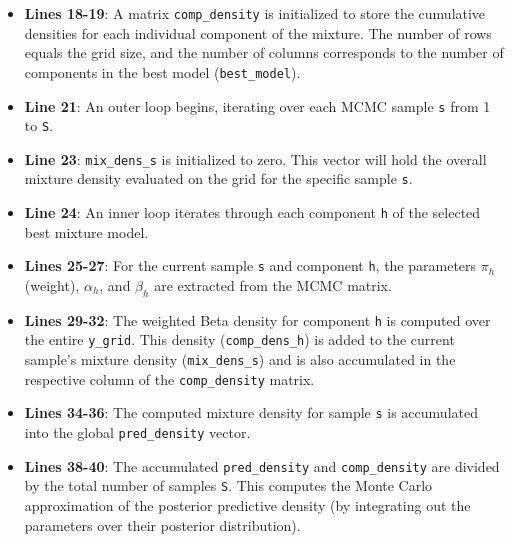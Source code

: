 \documentclass{article}
\begin{document}
\begin{itemize}
  \item \textbf{Lines 18-19}: A matrix \texttt{comp\_density} is initialized to store the cumulative densities for each individual component of the mixture. The number of rows equals the grid size, and the number of columns corresponds to the number of components in the best model (\texttt{best\_model}).
  \item \textbf{Line 21}: An outer loop begins, iterating over each MCMC sample \texttt{s} from 1 to \texttt{S}.
  \item \textbf{Line 23}: \texttt{mix\_dens\_s} is initialized to zero. This vector will hold the overall mixture density evaluated on the grid for the specific sample \texttt{s}.
  \item \textbf{Line 24}: An inner loop iterates through each component \texttt{h} of the selected best mixture model.
  \item \textbf{Lines 25-27}: For the current sample \texttt{s} and component \texttt{h}, the parameters $\pi_h$ (weight), $\alpha_h$, and $\beta_h$ are extracted from the MCMC matrix.
  \item \textbf{Lines 29-32}: The weighted Beta density for component \texttt{h} is computed over the entire \texttt{y\_grid}. This density (\texttt{comp\_dens\_h}) is added to the current sample's mixture density (\texttt{mix\_dens\_s}) and is also accumulated in the respective column of the \texttt{comp\_density} matrix.
  \item \textbf{Lines 34-36}: The computed mixture density for sample \texttt{s} is accumulated into the global \texttt{pred\_density} vector.
  \item \textbf{Lines 38-40}: The accumulated \texttt{pred\_density} and \texttt{comp\_density} are divided by the total number of samples \texttt{S}. This computes the Monte Carlo approximation of the posterior predictive density (by integrating out the parameters over their posterior distribution).
\end{itemize}
\end{document}
